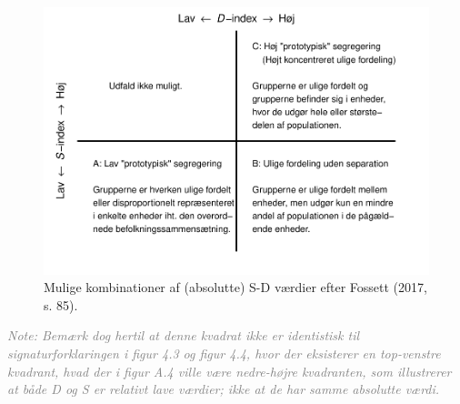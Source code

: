 \documentclass[
]{book}
\begin{document}
\begin{figure}
\includegraphics[width=1\linewidth]{en-befolkning-blander-sig_files/figure-latex/fig-9-4-1} \caption{Mulige kombinationer af (absolutte) S-D værdier efter Fossett (2017, s. 85).}\label{fig:fig-9-4}
\end{figure}

\begin{footnotesize}\textit{\textcolor{gray}{
Note: Bemærk dog hertil at denne kvadrat ikke er identistisk til signaturforklaringen i figur 4.3 og figur 4.4, hvor der eksisterer en top-venstre kvadrant, hvad der i figur A.4 ville være nedre-højre kvadranten, som illustrerer at både D og S er relativt lave værdier; ikke at de har samme absolutte værdi.
}}
\end{footnotesize}
\end{document}
